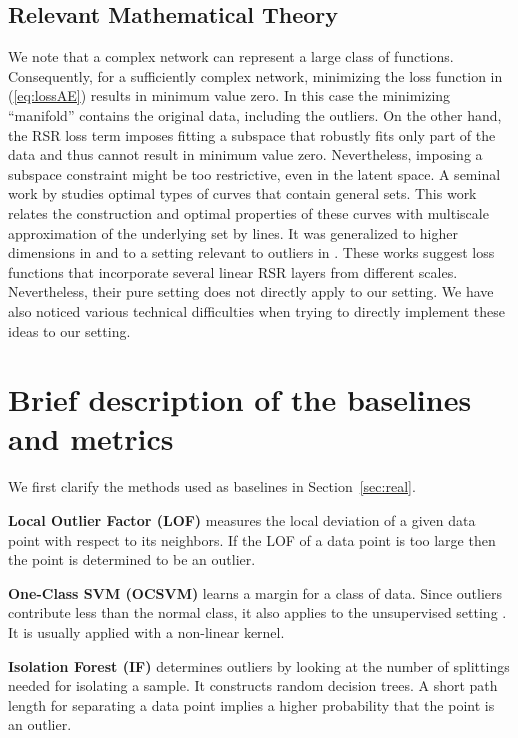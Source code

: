 \documentclass{article} \usepackage{iclr2020_conference,times}
\def\Secref#1{Section~\ref{#1}}
\def\eqref#1{(\ref{#1})}
\begin{document}
\subsection{Relevant Mathematical Theory}
\label{subsec:betas}
We note that a complex network can represent a large class of functions. 
Consequently, for a sufficiently complex network, minimizing the loss function in \eqref{eq:lossAE} results in minimum value zero. In this case the minimizing ``manifold'' contains the original data, including the outliers. On the other hand, the RSR loss term imposes fitting a subspace that robustly fits only part of the data and thus cannot result in minimum value zero. Nevertheless, imposing a subspace constraint might be too restrictive, even in the latent space.  A seminal work by \citet{Jones90} studies optimal types of curves that contain general sets. This work relates the construction and optimal properties of these curves with multiscale approximation of the underlying set by lines. It was generalized to higher dimensions in \citep{DS93} and to a setting relevant to outliers in \citep{Lerman03}. These works suggest loss functions that incorporate several linear RSR layers from different scales.
Nevertheless, their pure setting does not directly apply to our setting. We have also noticed various technical difficulties when trying to directly implement these ideas to our setting.


\section{Brief description of the baselines and metrics}
\label{sec:describe_baselines}
We first clarify the methods used as baselines in \Secref{sec:real}. 

\textbf{Local Outlier Factor (LOF)} measures the local deviation of a given data point with respect to its neighbors. If the LOF of a data point is too large then the point is determined to be an outlier. 

\textbf{One-Class SVM (OCSVM)} learns a margin for a class of data. Since outliers contribute less than the normal class, it also applies to the unsupervised setting \citep{goldstein2016comparative}. It is usually applied with a non-linear kernel.

\textbf{Isolation Forest (IF)} determines outliers by looking at the number of splittings needed for isolating a sample. It constructs random decision trees. A short path length for separating a data point implies a higher probability that the point is an outlier.
\end{document}
